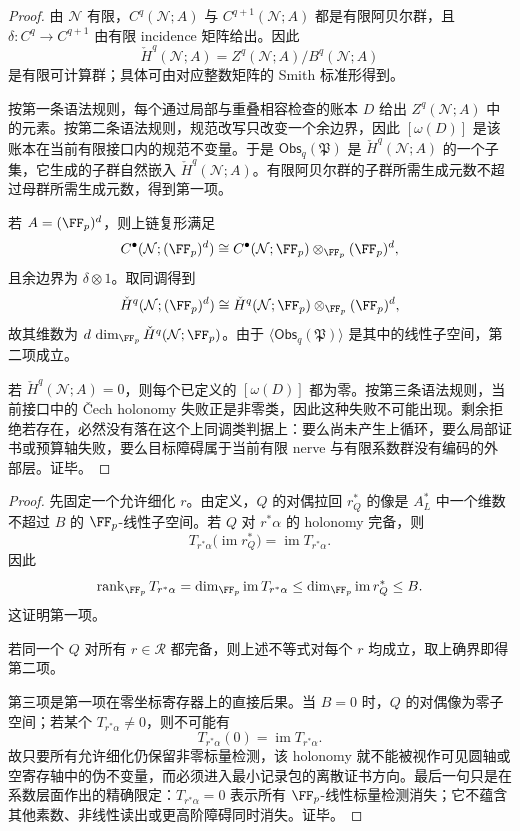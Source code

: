 \begin{proof}
由 \(\mathcal N\) 有限，\(C^q(\mathcal N;A)\) 与 \(C^{q+1}(\mathcal N;A)\) 都是有限阿贝尔群，且 \(\delta:C^q\to C^{q+1}\) 由有限 incidence 矩阵给出。因此
\[
\check H^q(\mathcal N;A)=Z^q(\mathcal N;A)/B^q(\mathcal N;A)
\]
是有限可计算群；具体可由对应整数矩阵的 Smith 标准形得到。

按第一条语法规则，每个通过局部与重叠相容检查的账本 \(D\) 给出 \(Z^q(\mathcal N;A)\) 中的元素。按第二条语法规则，规范改写只改变一个余边界，因此 \([\omega(D)]\) 是该账本在当前有限接口内的规范不变量。于是 \(\mathsf{Obs}_q(\mathfrak P)\) 是 \(\check H^q(\mathcal N;A)\) 的一个子集，它生成的子群自然嵌入 \(\check H^q(\mathcal N;A)\)。有限阿贝尔群的子群所需生成元数不超过母群所需生成元数，得到第一项。

若 \(A=(\FF_p)^d\)，则上链复形满足
\[
C^\bullet(\mathcal N;(\FF_p)^d)\cong C^\bullet(\mathcal N;\FF_p)\otimes_{\FF_p}(\FF_p)^d,
\]
且余边界为 \(\delta\otimes 1\)。取同调得到
\[
\check H^q(\mathcal N;(\FF_p)^d)\cong
\check H^q(\mathcal N;\FF_p)\otimes_{\FF_p}(\FF_p)^d,
\]
故其维数为 \(d\,\dim_{\FF_p}\check H^q(\mathcal N;\FF_p)\)。由于 \(\langle\mathsf{Obs}_q(\mathfrak P)\rangle\) 是其中的线性子空间，第二项成立。

若 \(\check H^q(\mathcal N;A)=0\)，则每个已定义的 \([\omega(D)]\) 都为零。按第三条语法规则，当前接口中的 \v Cech holonomy 失败正是非零类，因此这种失败不可能出现。剩余拒绝若存在，必然没有落在这个上同调类判据上：要么尚未产生上循环，要么局部证书或预算轴失败，要么目标障碍属于当前有限 nerve 与有限系数群没有编码的外部层。证毕。
\end{proof}

\begin{proof}
先固定一个允许细化 \(r\)。由定义，\(Q\) 的对偶拉回 \(r_Q^\ast\) 的像是 \(A_L^\ast\) 中一个维数不超过 \(B\) 的 \(\FF_p\)-线性子空间。若 \(Q\) 对 \(r^\ast\alpha\) 的 holonomy 完备，则
\[
T_{r^\ast\alpha}\bigl(\operatorname{im}r_Q^\ast\bigr)
=\operatorname{im}T_{r^\ast\alpha}.
\]
因此
\[
\operatorname{rank}_{\FF_p}T_{r^\ast\alpha}
=\dim_{\FF_p}\operatorname{im}T_{r^\ast\alpha}
\le \dim_{\FF_p}\operatorname{im}r_Q^\ast
\le B.
\]
这证明第一项。

若同一个 \(Q\) 对所有 \(r\in\mathscr R\) 都完备，则上述不等式对每个 \(r\) 均成立，取上确界即得第二项。

第三项是第一项在零坐标寄存器上的直接后果。当 \(B=0\) 时，\(Q\) 的对偶像为零子空间；若某个 \(T_{r^\ast\alpha}\ne0\)，则不可能有
\[
T_{r^\ast\alpha}(0)=\operatorname{im}T_{r^\ast\alpha}.
\]
故只要所有允许细化仍保留非零标量检测，该 holonomy 就不能被视作可见圆轴或空寄存轴中的伪不变量，而必须进入最小记录包的离散证书方向。最后一句只是在系数层面作出的精确限定：\(T_{r^\ast\alpha}=0\) 表示所有 \(\FF_p\)-线性标量检测消失；它不蕴含其他素数、非线性读出或更高阶障碍同时消失。证毕。
\end{proof}

